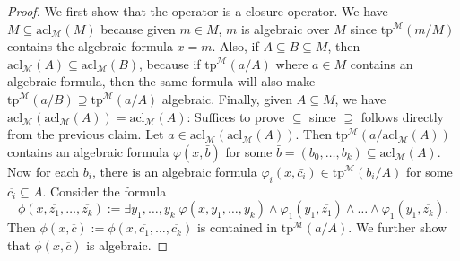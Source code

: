 \documentclass{article}
\begin{document}
\begin{enumerate}[label={\bf Q\arabic*:}]
    \begin{proof}
      We first show that the operator is a closure operator. We have
      $M\subseteq\text{acl}_\mathcal{M}(M)$ because given $m\in M$, $m$ is
      algebraic over $M$ since $\text{tp}^{\mathcal{M}}(m/M)$ contains the
      algebraic formula $x=m$. Also, if $A\subseteq B\subseteq M$, then
      $\text{acl}_\mathcal{M}(A) \subseteq\text{acl}_\mathcal{M}(B)$,
      because if $\text{tp}^{\mathcal{M}}(a/A)$ where $a\in M$ contains an
      algebraic formula, then the same formula will also make
      $\text{tp}^{\mathcal{M}}(a/B) \supseteq\text{tp}^{\mathcal{M}}(a/A)$
      algebraic. Finally, given $A\subseteq M$, we have
      $\text{acl}_\mathcal{M}(\text{acl}_\mathcal{M}(A))
      =\text{acl}_\mathcal{M}(A)$: Suffices to prove $\subseteq$ since
      $\supseteq$ follows directly from the previous claim. Let
      $a\in\text{acl}_\mathcal{M}(\text{acl}_\mathcal{M}(A))$. Then
      $\text{tp}^{\mathcal{M}}(a/\text{acl}_\mathcal{M}(A))$ contains an
      algebraic formula $\varphi(x,\bar{b})$ for some
      $\bar{b}=(b_0,\ldots,b_k)\subseteq \text{acl}_\mathcal{M}(A)$. Now
      for each $b_i$, there is an algebraic formula $\varphi_i(x,\bar{c_i})
      \in\text{tp}^{\mathcal{M}}(b_i/A)$ for some
      $\overline{c_i}\subseteq A$. Consider the formula
      \[\phi(x,\overline{z_1},\ldots,\overline{z_k}) :=\exists
      y_1,\ldots,y_k\; \varphi(x,y_1,\ldots,y_k)
      \wedge\varphi_1(y_1,\overline{z_1})\wedge\ldots
      \wedge\varphi_1(y_1,\overline{z_k}).\] Then $\phi(x,\overline{c}):=
      \phi(x,\overline{c_1},\ldots,\overline{c_k})$ is contained in
      $\text{tp}^{\mathcal{M}}(a/A)$. We further show that
      $\phi(x,\overline{c})$ is algebraic.
    \end{proof}
\end{enumerate}
\end{document}
